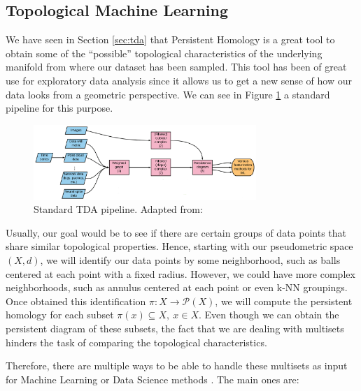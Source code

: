 \documentclass[../main.tex]{subfiles}
\begin{document}
\subsection{Topological Machine Learning}
\label{sec:topoML}

We have seen in Section \ref{sec:tda} that Persistent Homology is a great tool to obtain some of the ``possible'' topological characteristics of the underlying manifold from where our dataset has been sampled. This tool has been of great use for exploratory data analysis \cite{cheng_application_2020, topaz_topological_2015, amezquita_shape_2020} since it allows us to get a new sense of how our data looks from a geometric perspective. We can see in Figure \ref{fig:tdaPipe} a standard pipeline for this purpose.

\begin{figure}[!ht]
\centering
\includegraphics[width=0.75\textwidth]{figures/bg/pipelineTDA.png} 
\caption{Standard TDA pipeline. Adapted from: \cite{berwald_mathematics_2019}}
\label{fig:tdaPipe}
\end{figure}


Usually, our goal would be to see if there are certain groups of data points that share similar topological properties. Hence, starting with our pseudometric space $(X, d)$, we will identify our data points by some neighborhood, such as balls centered at each point with a fixed radius. However, we could have more complex neighborhoods, such as annulus centered at each point or even k-NN groupings. Once obtained this identification $\pi: X \to \mathcal{P}(X)$, we will compute the persistent homology for each subset $\pi(x) \subseteq X,\ x \in X$.  Even though we can obtain the persistent diagram of these subsets, the fact that we are dealing with multisets hinders the task of comparing the topological characteristics. 

Therefore, there are multiple ways to be able to handle these multisets as input for Machine Learning or Data Science methods \cite{hensel_survey_2021}. The main ones are:
\end{document}
